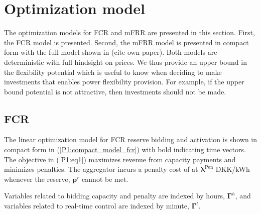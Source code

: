 \documentclass[lettersize,journal]{IEEEtran}
\begin{document}
\section{Optimization model}

The optimization models for FCR and mFRR are presented in this section. First, the FCR model is presented. Second, the mFRR model is presented in compact form with the full model shown in (cite own paper). Both models are deterministic with full hindsight on prices. We thus provide an upper bound in the flexibility potential which is useful to know when deciding to make investments that enables power flexibility provision. For example, if the upper bound potential is not attractive, then investments should not be made.

\subsection{FCR}

The linear optimization model for FCR reserve bidding and activation is shown in compact form in (\ref{P1:compact_model_fcr}) with bold indicating time vectors. The objective in (\ref{P1:eq1}) maximizes revenue from capacity payments and minimizes penalties. The aggregator incurs a penalty cost of at $\bm{\lambda}^{\text{Pen}}$ DKK/kWh whenever the reserve, $\bm{p}^{r}$ cannot be met.

Variables related to bidding capacity and penalty are indexed by hours, $\bm{\Gamma}^{h}$, and variables related to real-time control are indexed by minute, $\bm{\Gamma}^{t}$.
\end{document}
